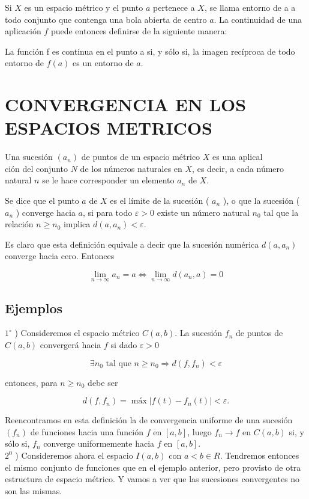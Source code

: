 \documentclass[10pt]{article}
\theoremstyle{plain}
\theoremstyle{definition}
\theoremstyle{remark}
\begin{document}
Si $X$ es un espacio métrico y el punto $a$ pertenece a $X$, se llama entorno de a a todo conjunto que contenga una bola abierta de centro $a$. La continuidad de una aplicación $f$ puede entonces definirse de la siguiente manera:

La función f es continua en el punto a si, y sólo si, la imagen recíproca de todo entorno de $f(a)$ es un entorno de $a$.

\section*{CONVERGENCIA EN LOS ESPACIOS METRICOS}
Una sucesión $\left(a_{n}\right)$ de puntos de un espacio métrico $X$ es una aplical\\
ción del conjunto $N$ de los números naturales en $X$, es decir, a cada número natural $n$ se le hace corresponder un elemento $a_{n}$ de $X$.

Se dice que el punto $a$ de $X$ es el límite de la sucesión ( $a_{n}$ ), o que la sucesión ( $a_{n}$ ) converge hacia $a$, si para todo $\varepsilon>0$ existe un número natural $n_{0}$ tal que la relación $n \geqslant n_{0}$ implica $d\left(a, a_{n}\right)<\varepsilon$.

Es claro que esta definición equivale a decir que la sucesión numérica $d\left(a, a_{n}\right)$ converge hacia cero. Entonces

$$
\lim _{n \rightarrow \infty} a_{n}=a \Longleftrightarrow \lim _{n \rightarrow \infty} d\left(a_{n}, a\right)=0
$$

\subsection{Ejemplos}
$1^{\circ}$ ) Consideremos el espacio métrico $C(a, b)$. La sucesión $f_{n}$ de puntos de $C(a, b)$ convergerá hacia $f$ si dado $\varepsilon>0$

$$
\exists n_{0} \text { tal que } n \geqslant n_{0} \Rightarrow d\left(f, f_{n}\right)<\varepsilon
$$

entonces, para $n \geqslant n_{0}$ debe ser

$$
d\left(f, f_{n}\right)=\operatorname{máx}\left|f(t)-f_{n}(t)\right|<\varepsilon .
$$

Reencontramos en esta definición la de convergencia uniforme de una sucesión $\left(f_{n}\right)$ de funciones hacia una función $f$ en $[a, b]$, luego $f_{n} \rightarrow f$ en $C(a, b)$ si, y sólo si, $f_{n}$ converge uniformemente hacia $f$ en $[a, b]$.\\
$2^{0}$ ) Consideremos ahora el espacio $I(a, b)$ con $a<b \in R$. Tendremos entonces el mismo conjunto de funciones que en el ejemplo anterior, pero provisto de otra estructura de espacio métrico. Y vamos a ver que las sucesiones convergentes no son las mismas.
\end{document}

